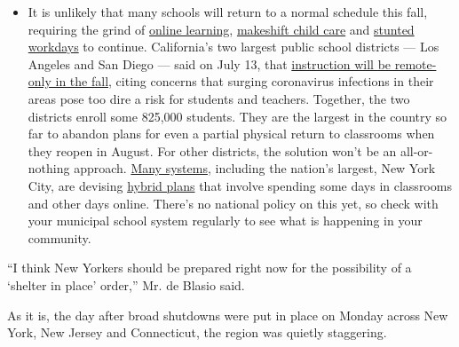 \begin{itemize}
  \begin{itemize}
  \tightlist
  \item
    It is unlikely that many schools will return to a normal schedule
    this fall, requiring the grind of
    \href{https://www.nytimes3xbfgragh.onion/2020/06/05/us/coronavirus-education-lost-learning.html?action=click\&pgtype=Article\&state=default\&region=MAIN_CONTENT_3\&context=storylines_faq}{online
    learning},
    \href{https://www.nytimes3xbfgragh.onion/2020/05/29/us/coronavirus-child-care-centers.html?action=click\&pgtype=Article\&state=default\&region=MAIN_CONTENT_3\&context=storylines_faq}{makeshift
    child care} and
    \href{https://www.nytimes3xbfgragh.onion/2020/06/03/business/economy/coronavirus-working-women.html?action=click\&pgtype=Article\&state=default\&region=MAIN_CONTENT_3\&context=storylines_faq}{stunted
    workdays} to continue. California's two largest public school
    districts --- Los Angeles and San Diego --- said on July 13, that
    \href{https://www.nytimes3xbfgragh.onion/2020/07/13/us/lausd-san-diego-school-reopening.html?action=click\&pgtype=Article\&state=default\&region=MAIN_CONTENT_3\&context=storylines_faq}{instruction
    will be remote-only in the fall}, citing concerns that surging
    coronavirus infections in their areas pose too dire a risk for
    students and teachers. Together, the two districts enroll some
    825,000 students. They are the largest in the country so far to
    abandon plans for even a partial physical return to classrooms when
    they reopen in August. For other districts, the solution won't be an
    all-or-nothing approach.
    \href{https://bioethics.jhu.edu/research-and-outreach/projects/eschool-initiative/school-policy-tracker/}{Many
    systems}, including the nation's largest, New York City, are
    devising
    \href{https://www.nytimes3xbfgragh.onion/2020/06/26/us/coronavirus-schools-reopen-fall.html?action=click\&pgtype=Article\&state=default\&region=MAIN_CONTENT_3\&context=storylines_faq}{hybrid
    plans} that involve spending some days in classrooms and other days
    online. There's no national policy on this yet, so check with your
    municipal school system regularly to see what is happening in your
    community.
  \end{itemize}
\end{itemize}

``I think New Yorkers should be prepared right now for the possibility
of a `shelter in place' order,'' Mr. de Blasio said.

As it is, the day after broad shutdowns were put in place on Monday
across New York, New Jersey and Connecticut, the region was quietly
staggering.

